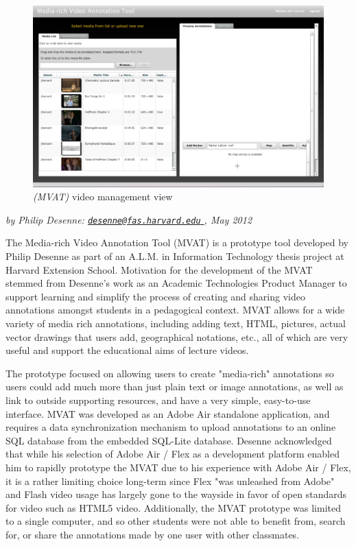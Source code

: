 \begin{figure}[!ht]
	\includegraphics[width=\textwidth]{gfx/mvat/mvat-video-management}
	\caption{\textit{(MVAT)} video management view} 
	\label{fig:mvat:video-management-view}
	\center{\noindent\rule{0.75\textwidth}{0.4pt}}
\end{figure}

\textit{by Philip Desenne: \href{mailto:desenne@fas.harvard.edu}{\nolinkurl{desenne@fas.harvard.edu} }, May 2012} \cite{Desenne:2012}

The Media-rich Video Annotation Tool (MVAT) is a prototype tool developed by Philip Desenne as part of an A.L.M. in Information Technology thesis project at Harvard Extension School.  Motivation for the development of the MVAT stemmed from Desenne's work as an Academic Technologies Product Manager to support learning and simplify the process of creating and sharing video annotations amongst students in a pedagogical context.  MVAT allows for a wide variety of media rich annotations, including adding text, HTML, pictures, actual vector drawings that users add, geographical notations, etc., all of which are very useful and support the educational aims of lecture videos.

The prototype focused on allowing users to create "media-rich" annotations so users could add much more than just plain text or image annotations, as well as link to outside supporting resources, and have a very simple, easy-to-use interface.  MVAT was developed as an Adobe Air standalone application, and requires a data synchronization mechanism to upload annotations to an online SQL database from the embedded SQL-Lite database.  Desenne acknowledged that while his selection of Adobe Air / Flex as a development platform enabled him to rapidly prototype the MVAT due to his experience with Adobe Air / Flex, it is a rather limiting choice long-term since Flex "was unleashed from Adobe" and Flash video usage has largely gone to the wayside in favor of open standards for video such as HTML5 video.  Additionally, the MVAT prototype was limited to a single computer, and so other students were not able to benefit from, search for, or share the annotations made by one user with other classmates.

